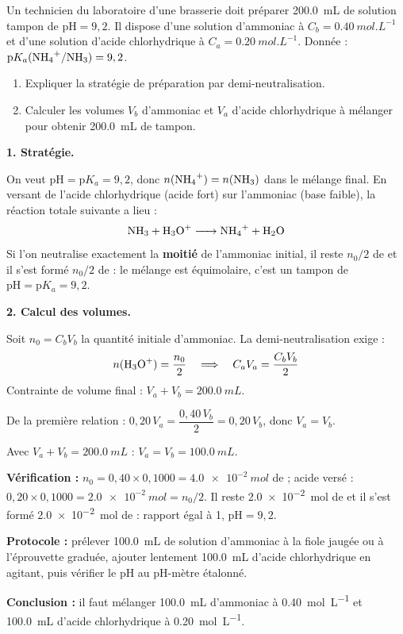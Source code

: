 \documentclass[11pt]{article}
\begin{document}
\begin{exoresolu}
Un technicien du laboratoire d'une brasserie doit préparer \SI{200,0}{mL} de solution tampon de $\text{pH} = 9,2$. Il dispose d'une solution d'ammoniac  à $C_b = \SI{0,40}{mol.L^{-1}}$ et d'une solution d'acide chlorhydrique à $C_a = \SI{0,20}{mol.L^{-1}}$. Donnée : $\text{p}K_a(\ce{NH4+}/\ce{NH3}) = 9,2$.
\begin{enumerate}
\item Expliquer la stratégie de préparation par demi-neutralisation.
\item Calculer les volumes $V_b$ d'ammoniac et $V_a$ d'acide chlorhydrique à mélanger pour obtenir \SI{200,0}{mL} de tampon.
\end{enumerate}
\tcblower
\textbf{1. Stratégie.}

On veut $\text{pH} = \text{p}K_a = 9,2$, donc $n(\ce{NH4+}) = n(\ce{NH3})$ dans le mélange final. En versant de l'acide chlorhydrique (acide fort) sur l'ammoniac (base faible), la réaction totale suivante a lieu :
\[ \ce{NH3 + H3O+ -> NH4+ + H2O} \]
Si l'on neutralise exactement la \textbf{moitié} de l'ammoniac initial, il reste $n_0/2$ de  et il s'est formé $n_0/2$ de  : le mélange est équimolaire, c'est un tampon de $\text{pH} = \text{p}K_a = 9,2$.

\textbf{2. Calcul des volumes.}

Soit $n_0 = C_b V_b$ la quantité initiale d'ammoniac. La demi-neutralisation exige :
\[ n(\ce{H3O+}) = \frac{n_0}{2} \quad\Longrightarrow\quad C_a V_a = \frac{C_b V_b}{2} \]
Contrainte de volume final : $V_a + V_b = \SI{200,0}{mL}$.

De la première relation : $0,20\,V_a = \dfrac{0,40\,V_b}{2} = 0,20\,V_b$, donc $V_a = V_b$.

Avec $V_a + V_b = \SI{200,0}{mL}$ : $V_a = V_b = \SI{100,0}{mL}$.

\textbf{Vérification :} $n_0 = 0,40 \times 0,1000 = \SI{4,0e-2}{mol}$ de  ; acide versé : $0,20 \times 0,1000 = \SI{2,0e-2}{mol} = n_0/2$. Il reste \SI{2,0e-2}{mol} de  et il s'est formé \SI{2,0e-2}{mol} de  : rapport égal à 1, $\text{pH} = 9,2$. \checkmark

\textbf{Protocole :} prélever \SI{100,0}{mL} de solution d'ammoniac à la fiole jaugée ou à l'éprouvette graduée, ajouter lentement \SI{100,0}{mL} d'acide chlorhydrique en agitant, puis vérifier le pH au pH-mètre étalonné.

\textbf{Conclusion :} il faut mélanger \SI{100,0}{mL} d'ammoniac à \SI{0,40}{mol.L^{-1}} et \SI{100,0}{mL} d'acide chlorhydrique à \SI{0,20}{mol.L^{-1}}.
\end{exoresolu}
\end{document}
